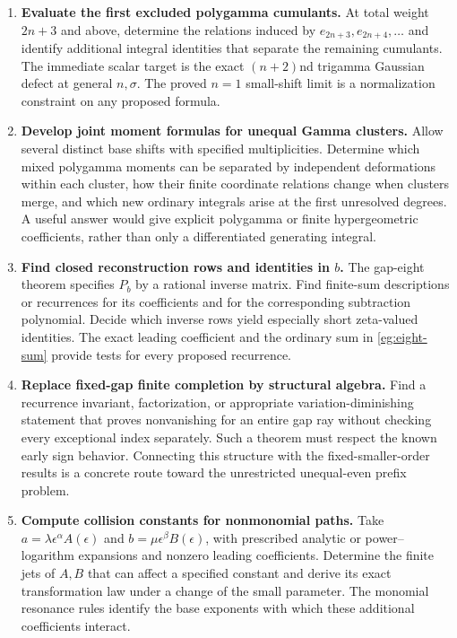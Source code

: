 \documentclass[11pt,a4paper]{article}
\numberwithin{equation}{section}
\theoremstyle{definition}
\theoremstyle{remark}
\begin{document}
\begin{enumerate}
\item \textbf{Evaluate the first excluded polygamma cumulants.}
At total weight $2n+3$ and above, determine the relations induced
by $e_{2n+3},e_{2n+4},\ldots$ and identify additional integral
identities that separate the remaining cumulants. The immediate
scalar target is the exact $(n+2)$nd trigamma Gaussian defect at
general $n,\sigma$. The proved $n=1$ small-shift limit is a
normalization constraint on any proposed formula.

\item \textbf{Develop joint moment formulas for unequal Gamma clusters.}
Allow several distinct base shifts with specified multiplicities.
Determine which mixed polygamma moments can be separated by
independent deformations within each cluster, how their finite
coordinate relations change when clusters merge, and which new
ordinary integrals arise at the first unresolved degrees. A useful
answer would give explicit polygamma or finite hypergeometric
coefficients, rather than only a differentiated generating integral.

\item \textbf{Find closed reconstruction rows and identities in $b$.}
The gap-eight theorem specifies $P_b$ by a rational inverse matrix.
Find finite-sum descriptions or recurrences for its coefficients and
for the corresponding subtraction polynomial. Decide which inverse
rows yield especially short zeta-valued identities. The exact
leading coefficient and the ordinary sum in
\eqref{eg:eight-sum} provide tests for every proposed recurrence.

\item \textbf{Replace fixed-gap finite completion by structural algebra.}
Find a recurrence invariant, factorization, or appropriate
variation-diminishing statement that proves nonvanishing for an
entire gap ray without checking every exceptional index separately.
Such a theorem must respect the known early sign behavior.
Connecting this structure with the fixed-smaller-order results is a
concrete route toward the unrestricted unequal-even prefix problem.

\item \textbf{Compute collision constants for nonmonomial paths.}
Take $a=\lambda\epsilon^\alpha A(\epsilon)$ and
$b=\mu\epsilon^\beta B(\epsilon)$, with prescribed analytic or
power--logarithm expansions and nonzero leading coefficients.
Determine the finite jets of $A,B$ that can affect a specified
constant and derive its exact transformation law under a change of
the small parameter. The monomial resonance rules identify the
base exponents with which these additional coefficients interact.


\end{enumerate}
\end{document}
